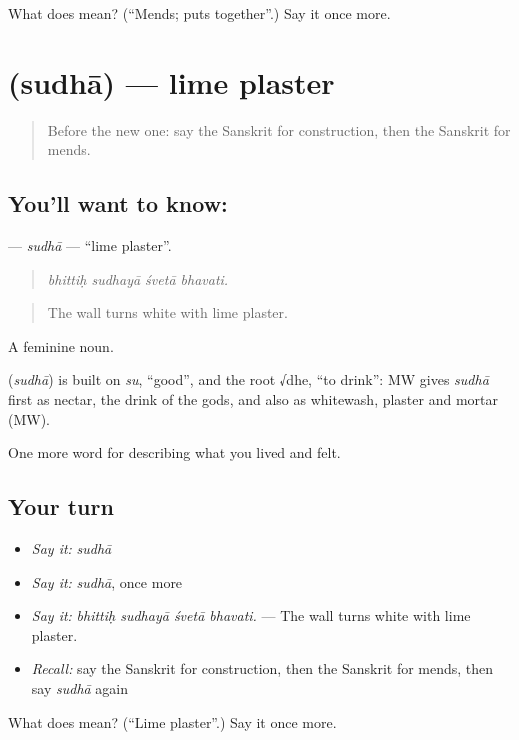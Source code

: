 \begin{tcolorbox}[breakable,colback=teal!4,colframe=teal!35!black,title={Before you move on}]
What does  mean? (\textquotedblleft{}Mends; puts together\textquotedblright{}.) Say it once more.
\end{tcolorbox}
\section[\texorpdfstring{\sk{सुधा} (sudhā)}{सुधा (sudhā)}]{ (sudhā) — lime plaster}

\label{lesson:SA-C508-sudha}



\begin{quote}
Before the new one: say the Sanskrit for construction, then the Sanskrit for mends.
\end{quote}

\subsection*{You'll want to know: }
\textbf{} — \emph{sudhā} — \textquotedblleft{}lime plaster\textquotedblright{}.

\begin{quote}
   
\end{quote}

\begin{quote}
\emph{bhittiḥ sudhayā śvetā bhavati.}
\end{quote}

\begin{quote}
The wall turns white with lime plaster.
\end{quote}

A feminine noun.

\begin{cousinweb}
\textbf{} (\emph{sudhā}) is built on \emph{su}, \textquotedblleft{}good\textquotedblright{}, and the root √dhe, \textquotedblleft{}to drink\textquotedblright{}: MW gives \emph{sudhā} first as nectar, the drink of the gods, and also as whitewash, plaster and mortar (MW).
\end{cousinweb}

\begin{grammarlens}[title={What you've built}]
One more word for describing what you lived and felt.
\end{grammarlens}

\subsection*{Your turn}
\begin{itemize}
\raggedright
  \item \emph{Say it:} \emph{sudhā}
  \item \emph{Say it:} \emph{sudhā}, once more
  \item \emph{Say it:} \emph{bhittiḥ sudhayā śvetā bhavati.} — The wall turns white with lime plaster.
  \item \emph{Recall:} say the Sanskrit for construction, then the Sanskrit for mends, then say \emph{sudhā} again
\end{itemize}

\begin{tcolorbox}[breakable,colback=teal!4,colframe=teal!35!black,title={Before you move on}]
What does  mean? (\textquotedblleft{}Lime plaster\textquotedblright{}.) Say it once more.
\end{tcolorbox}
